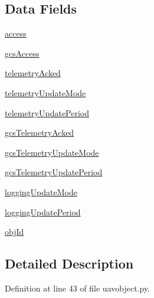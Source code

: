 \subsection*{Data Fields}
\begin{DoxyCompactItemize}
\item 
\hyperlink{classuavobject_1_1_u_a_v_object_metadata_ab53e59b97cf3d8bca5b07088a60ba40f}{access}
\item 
\hyperlink{classuavobject_1_1_u_a_v_object_metadata_af0b8488a4c8bb1a50bbac806f22bf656}{gcs\-Access}
\item 
\hyperlink{classuavobject_1_1_u_a_v_object_metadata_a6db603de03ffee19a9d87a5fcb3e061a}{telemetry\-Acked}
\item 
\hyperlink{classuavobject_1_1_u_a_v_object_metadata_a69cc9ce6fccdbdddc4d84594fc1f9b17}{telemetry\-Update\-Mode}
\item 
\hyperlink{classuavobject_1_1_u_a_v_object_metadata_a83392d1f62434b4421bb27a5557b7436}{telemetry\-Update\-Period}
\item 
\hyperlink{classuavobject_1_1_u_a_v_object_metadata_ac5e05f3b4b83c639c727a5e4729fc879}{gcs\-Telemetry\-Acked}
\item 
\hyperlink{classuavobject_1_1_u_a_v_object_metadata_ab479d0f584976724f6b22b15ceb62b8f}{gcs\-Telemetry\-Update\-Mode}
\item 
\hyperlink{classuavobject_1_1_u_a_v_object_metadata_a7ac85bf7eacc9bf93cb67c02a348c5d5}{gcs\-Telemetry\-Update\-Period}
\item 
\hyperlink{classuavobject_1_1_u_a_v_object_metadata_a1eb245c4c691dcf5bd245d13c76b10e2}{logging\-Update\-Mode}
\item 
\hyperlink{classuavobject_1_1_u_a_v_object_metadata_a42d69560bb4cd54063892f566a7d4b1d}{logging\-Update\-Period}
\item 
\hyperlink{classuavobject_1_1_u_a_v_object_metadata_afdb35886b9b80c3d0c14039310ab7023}{obj\-Id}
\end{DoxyCompactItemize}


\subsection{Detailed Description}


Definition at line 43 of file uavobject.\-py.



